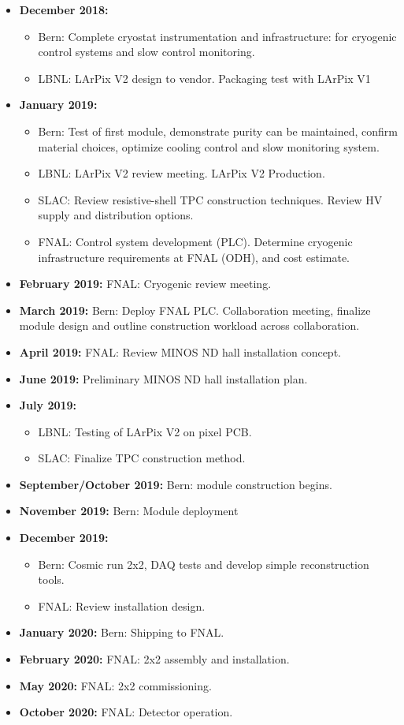 \begin{itemize}
\item {\bf December 2018:}
\begin{itemize}
\item Bern: Complete cryostat instrumentation and infrastructure: for cryogenic control systems and slow control monitoring. 
\item LBNL: LArPix V2 design to vendor. Packaging test with LArPix V1
\end{itemize}
\item {\bf January 2019:} 
\begin{itemize}
	\item Bern: Test of first module, demonstrate purity can be maintained, confirm material choices, optimize cooling control and slow monitoring system.   
	\item LBNL: LArPix V2 review meeting. LArPix V2 Production.
	\item SLAC: Review resistive-shell TPC construction techniques. Review HV supply and distribution options.   
	\item FNAL: Control system development (PLC). Determine cryogenic infrastructure requirements at FNAL (ODH), and cost 
	estimate.  
\end{itemize}
\item {\bf February 2019:} FNAL: Cryogenic review meeting.  
\item {\bf March 2019:} Bern: Deploy FNAL PLC. Collaboration meeting, finalize module design and outline construction workload across collaboration.    
\item {\bf April 2019:} FNAL: Review MINOS ND hall installation concept.
\item {\bf June 2019:} Preliminary MINOS ND hall installation plan.
\item {\bf July 2019:} 
\begin{itemize}
	\item LBNL: Testing of LArPix V2 on pixel PCB.   
	\item SLAC: Finalize TPC construction method.  
\end{itemize}
\item {\bf September/October 2019:} Bern: module construction begins.
 \item {\bf November 2019:} Bern: Module deployment 
\item {\bf December 2019:} 
\begin{itemize}
	\item Bern: Cosmic run  2x2, DAQ tests and develop simple reconstruction tools.   
	\item FNAL: Review installation design.  
\end{itemize}
\item {\bf January 2020:} Bern: Shipping to FNAL.
\item {\bf February 2020:} FNAL: 2x2 assembly and installation.
\item {\bf May 2020:} FNAL: 2x2 commissioning.    
\item {\bf October 2020:} FNAL: Detector operation.

\end{itemize}
